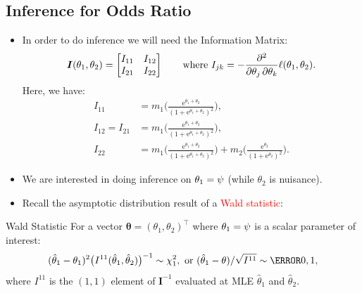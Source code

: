 \documentclass[oneside]{book}\usepackage[]{graphicx}\usepackage[svgnames]{xcolor}
\let\log\relax%
\providecommand{\Vector}[1]{\bm{#1}}%
\providecommand{\Matrix}[1]{\bm{#1}}
\begin{document}
\subsection*{Inference for Odds Ratio}
\begin{itemize}
      \item In order to do inference we will need the Information Matrix:
            \[ \Matrix{I}(\theta_1,\theta_2)=\begin{bmatrix}
                        I_{11} & I_{12} \\
                        I_{21} & I_{22}
                  \end{bmatrix}\qquad\text{where }I_{jk}=-\pdv*{\ell(\theta_1,\theta_2)}{\theta_j,\theta_k}. \]
            Here, we have:
            \begin{align*}
                  I_{11}          & =m_1\biggl(\frac{\mathrm{e}^{\theta_1+\theta_2}}{(1+\mathrm{e}^{\theta_1+\theta_2})^2} \biggr),                                                                             \\
                  I_{12}  =I_{21} & =m_1\biggl(\frac{\mathrm{e}^{\theta_1+\theta_2}}{(1+\mathrm{e}^{\theta_1+\theta_2})^2} \biggr),                                                                             \\
                  I_{22}          & =m_1\biggl(\frac{\mathrm{e}^{\theta_1+\theta_2}}{(1+\mathrm{e}^{\theta_1+\theta_2})^2} \biggr)+m_2\biggl(\frac{\mathrm{e}^{\theta_2}}{(1+\mathrm{e}^{\theta_2})^2} \biggr).
            \end{align*}
      \item We are interested in doing inference on $ \theta_1=\log{\psi} $ (while $ \theta_2 $ is nuisance).
      \item Recall the asymptotic distribution result of a \textcolor{Red}{Wald statistic}:
\end{itemize}
\begin{Regular}{Wald Statistic}
      For a vector $ \Vector{\theta}=(\theta_1,\theta_2)^\top $ where $ \theta_1=\log{\psi} $ is a scalar parameter of interest:
      \[ (\hat{\theta}_1-\theta_1)^2\bigl(I^{11}(\hat{\theta}_1,\hat{\theta}_2)\bigr)^{-1}\sim \chi^2_{1},
            \text{ or }(\hat{\theta}_1-\theta)/\sqrt{I^{11}} \sim \N{0,1}, \]
      where $ I^{11} $ is the $ (1,1) $ element of $ \Matrix{I}^{-1} $ evaluated at MLE $ \hat{\theta}_1 $ and $ \hat{\theta}_2 $.
\end{Regular}
\end{document}
